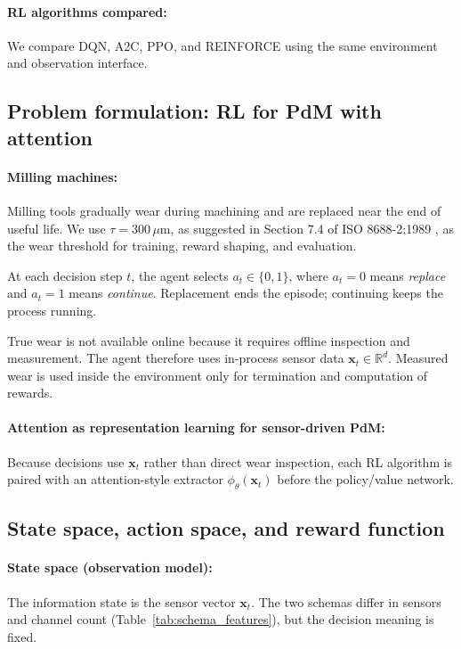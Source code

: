 \documentclass[sn-basic]{sn-jnl}%
\begin{document}
\paragraph{RL algorithms compared:}
We compare DQN, A2C, PPO, and \textsc{REINFORCE} using the same environment and observation interface.

\subsection{Problem formulation: RL for PdM with attention} \label{sec:env} \label{app:env_reward}
\paragraph{Milling machines:}
Milling tools gradually wear during machining and are replaced near the end of useful life. We use $\tau = 300\,\mu\mathrm{m}$, as suggested in Section 7.4 of ISO 8688-2:1989 \citep{ISO8688-2-1989}, as the wear threshold for training, reward shaping, and evaluation.

At each decision step $t$, the agent selects $a_t\in\{0,1\}$, where $a_t=0$ means \emph{replace} and $a_t=1$ means \emph{continue}. Replacement ends the episode; continuing keeps the process running.

True wear is not available online because it requires offline inspection and measurement. The agent therefore uses in-process sensor data $\mathbf{x}_t\in\mathbb{R}^d$. Measured wear is used inside the environment only for termination and computation of rewards.

\paragraph{Attention as representation learning for sensor-driven PdM:}
Because decisions use $\mathbf{x}_t$ rather than direct wear inspection, each RL algorithm is paired with an attention-style extractor $\phi_\theta(\mathbf{x}_t)$ before the policy/value network.

\subsection{State space, action space, and reward function}
\label{sec:mdp_components}

\paragraph{State space (observation model):}
The information state is the sensor vector $\mathbf{x}_t$. The two schemas differ in sensors and channel count (Table~\ref{tab:schema_features}), but the decision meaning is fixed.
\end{document}
